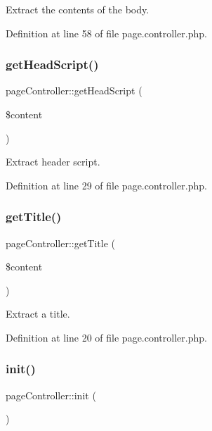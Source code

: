Extract the contents of the body. 



Definition at line 58 of file page.\+controller.\+php.

\mbox{\label{classpageController_a7fc1046874a92835813b27613857890c}} 
\subsubsection{\texorpdfstring{get\+Head\+Script()}{getHeadScript()}}
{\footnotesize\ttfamily page\+Controller\+::get\+Head\+Script (\begin{DoxyParamCaption}\item[{}]{\$content }\end{DoxyParamCaption})}



Extract header script. 



Definition at line 29 of file page.\+controller.\+php.

\mbox{\label{classpageController_ab5c9e55fad71e3a0c961b3d84d660f3c}} 
\subsubsection{\texorpdfstring{get\+Title()}{getTitle()}}
{\footnotesize\ttfamily page\+Controller\+::get\+Title (\begin{DoxyParamCaption}\item[{}]{\$content }\end{DoxyParamCaption})}



Extract a title. 



Definition at line 20 of file page.\+controller.\+php.

\mbox{\label{classpageController_ace5123ac45ab7dc1c9c39f3e1901e0a0}} 
\subsubsection{\texorpdfstring{init()}{init()}}
{\footnotesize\ttfamily page\+Controller\+::init (\begin{DoxyParamCaption}{ }\end{DoxyParamCaption})}



